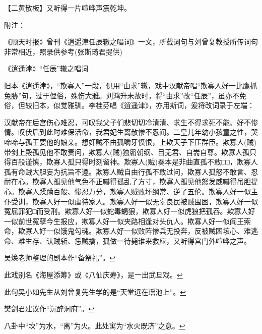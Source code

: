 【二黄散板】又听得一片喧哗声震乾坤。

附注：

《顺天时报》曾刊《逍遥津任辰辙之唱词》一文，所载词句与刘曾复教授所传词句非常相近，照录供参考(张斯琦君提供)

《逍遥津》``任辰''辙之唱词

旧本《逍遥津》，``欺寡人''一段，俱用``由求''辙，戏中汉献帝唱``欺寡人好一比鹰抓兔胁''句，过于俚俗，殊伤大雅。刘鸿升未故时，将``由求''改``任辰''，虽亦不免俗，但较旧本，似觉雅驯。李桂芬唱《逍遥津》，亦用斯词，爰将改词录于左端：

汉献帝在后宫伤心难忍，可叹我父子们悲切切冷清清、求生不得求死不能、好不惨情。叹伏后到此时难保活命，我君妃生离散惨不忍闻。二皇儿年幼小孩童之性，哭啼啼与孤王要他的娘亲。想奸贼不由孤嚼牙愤恨，上欺天子下压群臣。欺寡人(贼)带剑上殿孤见他不敢责问，欺寡人(贼)独霸朝纲、目无君、自耑自尊。欺寡人孤只得百般谨慎，欺寡人孤只得时刻留神。欺寡人(贼)奏本是非曲直孤不敢□□，欺寡人孤有命贼大胆妄为抗旨不遵。欺寡人贼自由行孤不敢过问，欺寡人孤怒不敢言、忍耐在心。欺寡人孤见他气色不正嚇得孤乱了方寸，欺寡人孤见他怒发威嚇得吊胆提心。欺寡人蹂躏百般、惨忍万分，欺寡人贼败坏纲常、逆了五伦。欺寡人好一似主仆受训，欺寡人好一似虐待家人。欺寡人好一似无辜良民被贼围困，欺寡人好一似冤屈罪犯□而受刑。欺寡人好一似蛇毒蝎狠，欺寡人好一似虎狼把孤吞。欺寡人好一似前世冤孽今生报应，欺寡人好一似夹路相逢对头仇人。欺寡人好一似阎王索命，欺寡人好一似饿鬼勾魂。欺寡人好一似败阵惨兵无投奔，反被贼困垓心、难逃命、难生存、认贼斩、恁贼擒，孤做一待毙谁来救应，又听得宫门外喧哗之声。

\item
  \leavevmode\hypertarget{fn631}{}%
  吴焕老师整理的剧本作``备祭礼''。\protect\hyperlink{fnref631}{↩}
\item
  \leavevmode\hypertarget{fn632}{}%
  此戏别名《海屋添筹》或《八仙庆寿》，是一出武旦戏。\protect\hyperlink{fnref632}{↩}
\item
  \leavevmode\hypertarget{fn633}{}%
  此句吴小如先生从刘曾复先生学的是``天堂远在瑶池上''。\protect\hyperlink{fnref633}{↩}
\item
  \leavevmode\hypertarget{fn634}{}%
  樊剑君建议作``沉醉洞府''。\protect\hyperlink{fnref634}{↩}
\item
  \leavevmode\hypertarget{fn635}{}%
  八卦中``坎''为水，``离''为火。此处寓为``水火既济''之意。\protect\hyperlink{fnref635}{↩}
